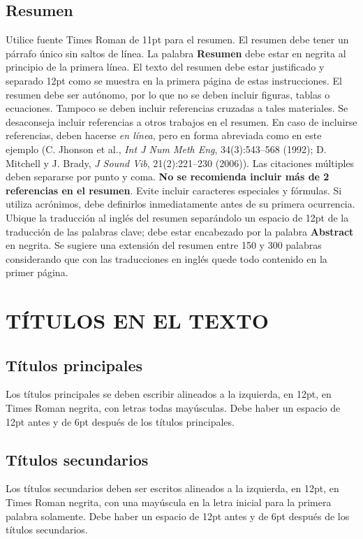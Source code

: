 \documentclass[oneside,a4paper,spanish,links]{amca}
\begin{document}
\subsection{Resumen}

Utilice fuente Times Roman de 11pt para el resumen. El resumen
debe tener un párrafo único sin saltos de línea. La palabra
\textbf{Resumen} debe estar en negrita al principio de la primera
línea. El texto del resumen debe estar justificado y separado 12pt
como se muestra en la primera página de estas instrucciones. El
resumen debe ser autónomo, por lo que no se deben incluir figuras,
tablas o ecuaciones. Tampoco se deben incluir referencias cruzadas
a tales materiales. Se desaconseja incluir referencias a otros
trabajos en el resumen. En caso de incluirse referencias, deben
hacerse \emph{en línea}, pero en forma abreviada como en este
ejemplo (C. Jhonson et al., \emph{Int J Num Meth Eng},
34(3):543--568 (1992); D. Mitchell y J. Brady, \emph{J Sound Vib},
21(2):221--230 (2006)). Las citaciones múltiples deben separarse
por punto y coma. \textbf{No se recomienda incluir más de 2
referencias en el resumen}. Evite incluir caracteres especiales y
fórmulas. Si utiliza acrónimos, debe definirlos inmediatamente
antes de su primera ocurrencia. Ubique la traducción al inglés del
resumen separándolo un espacio de 12pt de la traducción de las
palabras clave; debe estar encabezado por la palabra
\textbf{Abstract} en negrita. Se sugiere una extensión del resumen
entre 150 y 300 palabras considerando que con las traducciones en
inglés quede todo contenido en la primer página.

\section{TÍTULOS EN EL TEXTO}

\subsection{Títulos principales}

Los títulos principales se deben escribir alineados a la
izquierda, en 12pt, en Times Roman negrita, con letras todas
mayúsculas. Debe haber un espacio de 12pt antes y de 6pt después
de los títulos principales.

\subsection{Títulos secundarios}

Los títulos secundarios deben ser escritos alineados a la
izquierda, en 12pt, en Times Roman negrita, con una mayúscula en
la letra inicial para la primera palabra solamente. Debe haber un
espacio de 12pt antes y de 6pt después de los títulos secundarios.
\end{document}
